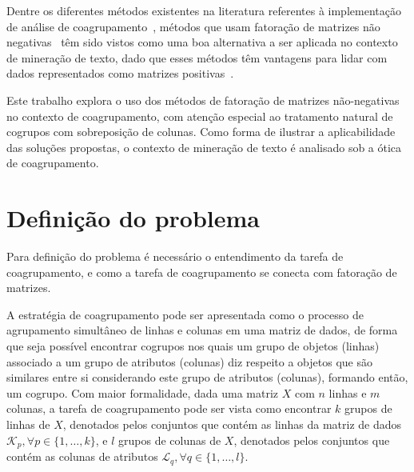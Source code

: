 \documentclass[
    12pt,                %
    oneside,            %
    a4paper,            %
    english,            %
    brazil                %
    ]{abntex2ppgsi}
\begin{document}
Dentre os diferentes métodos existentes na literatura referentes à implementação de análise de coagrupamento~\cite{Franca2010,Mirkin1996,Madeira2004}, métodos que usam fatoração de matrizes não negativas~\cite{lee:nnmf00,lee99} têm sido vistos como uma boa alternativa a ser aplicada no contexto de mineração de texto, dado que esses métodos têm vantagens para lidar com dados representados como matrizes positivas~\cite{Xu2003,Shahnaz2006373,Yoo2010}.

Este trabalho explora o uso dos métodos de fatoração de matrizes não-negativas no contexto de coagrupamento, com atenção especial ao tratamento natural de cogrupos com sobreposição de colunas.
Como forma de ilustrar a aplicabilidade das soluções propostas, o contexto de mineração de texto é analisado sob a ótica de coagrupamento.


\section{Definição do problema}
\label{sec:problemdef}




Para definição do problema é necessário o entendimento da tarefa de coagrupamento, e como a tarefa de coagrupamento se conecta com fatoração de matrizes.

A estratégia de coagrupamento pode ser apresentada como o processo de agrupamento simultâneo de linhas e colunas em uma matriz de dados, de forma que seja possível encontrar cogrupos nos quais um grupo de objetos (linhas) associado a um grupo de atributos (colunas) diz respeito a objetos que são similares entre si considerando este grupo de atributos (colunas), formando então, um cogrupo.
Com maior formalidade, dada uma matriz $X$ com $n$ linhas e $m$ colunas, a tarefa de coagrupamento pode ser vista como encontrar $k$ grupos de linhas de $X$, denotados pelos conjuntos que contém as linhas da matriz de dados $\mathcal{K}_p, \forall p \in \{1, \dots, k\}$, e $l$ grupos de colunas de $X$, denotados pelos conjuntos que contém as colunas de atributos $\mathcal{L}_q, \forall q \in \{1, \dots, l\}$.
\end{document}
